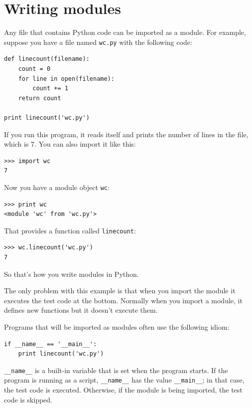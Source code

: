 \documentclass[10pt]{book}
\begin{document}
\section{Writing modules}
\label{modules}


Any file that contains Python code can be imported as a module.
For example, suppose you have a file named {\tt wc.py} with the following
code:

\beforeverb
\begin{verbatim}
def linecount(filename):
    count = 0
    for line in open(filename):
        count += 1
    return count

print linecount('wc.py')
\end{verbatim}
\afterverb
%
If you run this program, it reads itself and prints the number
of lines in the file, which is 7.
You can also import it like this:

\beforeverb
\begin{verbatim}
>>> import wc
7
\end{verbatim}
\afterverb
%
Now you have a module object {\tt wc}:


\beforeverb
\begin{verbatim}
>>> print wc
<module 'wc' from 'wc.py'>
\end{verbatim}
\afterverb
%
That provides a function called \verb"linecount":

\beforeverb
\begin{verbatim}
>>> wc.linecount('wc.py')
7
\end{verbatim}
\afterverb
%
So that's how you write modules in Python.

The only problem with this example is that when you import
the module it executes the test code at the bottom.  Normally
when you import a module, it defines new functions but it
doesn't execute them.


Programs that will be imported as modules often
use the following idiom:

\beforeverb
\begin{verbatim}
if __name__ == '__main__':
    print linecount('wc.py')
\end{verbatim}
\afterverb
%
\verb"__name__" is a built-in variable that is set when the
program starts.  If the program is running as a script,
\verb"__name__" has the value \verb"__main__"; in that
case, the test code is executed.  Otherwise,
if the module is being imported, the test code is skipped.
\end{document}
